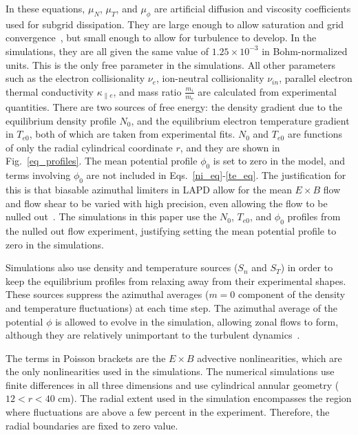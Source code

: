 \documentclass[showpacs,preprintnumbers,amsmath,amssymb,superscriptaddress,aip]{revtex4-1}
\newcommand{\nue}{\nu_{e}}
\newcommand{\nuin}{\nu_{in}}
\newcommand{\kpe}{\kappa_{\parallel e}}
\newcommand{\fmie}{\frac{m_i}{m_e}}
\begin{document}
In these equations, $\mu_N$, $\mu_T$, and $\mu_\phi$ are artificial diffusion and viscosity coefficients used for subgrid dissipation. They are large enough to allow saturation
and grid convergence~\cite{friedman2012}, but small enough to allow for turbulence to develop. In the simulations, they are all given the same value of $1.25 \times 10^{-3}$ in Bohm-normalized units. 
This is the only free parameter in the simulations. All other parameters such as the electron collisionality $\nue$, ion-neutral
collisionality $\nuin$, parallel electron thermal conductivity $\kpe$, and mass ratio $\fmie$ are calculated from experimental quantities.
There are two sources of free energy: the density gradient due to the equilibrium density profile $N_0$, and the equilibrium electron temperature gradient in $T_{e0}$, both of which are
taken from experimental fits. $N_0$ and $T_{e0}$ are functions of only the radial cylindrical coordinate $r$, and they are shown in Fig.~\ref{eq_profiles}. 
The mean potential profile $\phi_0$ is set to zero in the model, and terms involving $\phi_0$ are not included in Eqs.~\ref{ni_eq}-\ref{te_eq}. 
The justification for this is that biasable azimuthal limiters in LAPD allow for the mean $E \times B$ flow and flow shear to be varied with high precision, even allowing the flow to be
nulled out~\cite{schaffner2012}. 
The simulations in this paper use the $N_0$, $T_{e0}$, and $\phi_0$ profiles from the nulled out flow experiment, justifying setting the mean potential profile to zero in the simulations.

Simulations also use density and temperature sources ($S_n$ and $S_T$) in order to keep the equilibrium profiles from relaxing away from their experimental shapes. 
These sources suppress the azimuthal averages ($m=0$ component of the density and temperature fluctuations) at each time step. 
The azimuthal average of the potential $\phi$ is allowed to evolve in
the simulation, allowing zonal flows to form, although they are relatively unimportant to the turbulent dynamics~\cite{friedman2012b}.

The terms in Poisson brackets are the $E \times B$ advective nonlinearities, which are the only nonlinearities used in the simulations.
The numerical simulations use finite differences in all three dimensions and use cylindrical annular geometry ($12<r<40$ cm). The radial extent used in the simulation
encompasses the region where fluctuations are above a few percent in the experiment. Therefore, the radial boundaries are fixed to zero value.
\end{document}
